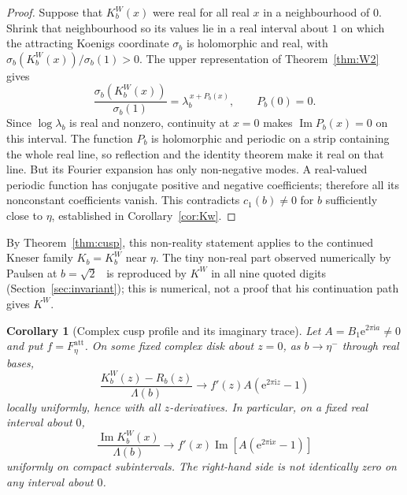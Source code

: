 \documentclass[11pt]{amsart}
\newtheorem{corollary}[theorem]{Corollary}
\theoremstyle{definition}
\newcommand{\Rr}{R}
\newcommand{\Kk}{K}
\newcommand{\eee}{\mathrm{e}}
\newcommand{\ii}{\mathrm{i}}
\begin{document}
\begin{proof}
Suppose that $\Kk_b^W(x)$ were real for all real $x$ in a neighbourhood
of $0$.  Shrink that neighbourhood so its values lie in a real interval
about $1$ on which the attracting Koenigs coordinate $\sigma_b$ is
holomorphic and real, with $\sigma_b(\Kk_b^W(x))/\sigma_b(1)>0$.
The upper representation of Theorem~\ref{thm:W2} gives
\[
 \frac{\sigma_b(\Kk_b^W(x))}{\sigma_b(1)}
   =\lambda_b^{\,x+P_b(x)},\qquad P_b(0)=0.
\]
Since $\log\lambda_b$ is real and nonzero, continuity at $x=0$ makes
$\operatorname{Im}P_b(x)=0$ on this interval.  The function $P_b$ is
holomorphic and periodic on a strip containing the whole real line,
so reflection and the identity theorem make it real on that line.
But its Fourier expansion has only non-negative modes.  A real-valued
periodic function has conjugate positive and negative coefficients;
therefore all its nonconstant coefficients vanish.  This contradicts
$c_1(b)\ne0$ for $b$ sufficiently close to $\eta$, established in
Corollary~\ref{cor:Kw}.
\end{proof}

By Theorem~\ref{thm:cusp}, this non-reality statement applies to the
continued Kneser family $\Kk_b=\Kk^W_b$ near $\eta$.
The tiny non-real part observed numerically by Paulsen at
$b=\sqrt2$~\cite[\S6]{Paulsen2019} is reproduced by $\Kk^W$ in all nine quoted
digits (Section~\ref{sec:invariant}); this is numerical, not a proof that his
continuation path gives $\Kk^W$.

\begin{corollary}[Complex cusp profile and its imaginary trace]
\label{cor:imaginary-profile}
Let $A=B_1\eee^{2\pi\ii a}\ne0$ and put $f=F_\eta^{\mathrm{att}}$.
On some fixed complex disk about $z=0$, as $b\to\eta^-$ through real bases,
\[
 \frac{\Kk_b^W(z)-\Rr_b(z)}{\Lambda(b)}
 \longrightarrow f'(z)A(\eee^{2\pi\ii z}-1)
\]
locally uniformly, hence with all $z$-derivatives.  In particular, on
a fixed real interval about $0$,
\[
 \frac{\operatorname{Im}\Kk_b^W(x)}{\Lambda(b)}
 \longrightarrow
 f'(x)
   \operatorname{Im}\!\left[A(\eee^{2\pi\ii x}-1)\right]
\]
uniformly on compact subintervals.  The right-hand side is not
identically zero on any interval about $0$.
\end{corollary}
\end{document}

